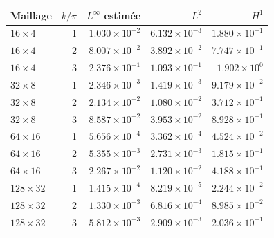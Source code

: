 \begin{tabular}{lrrrr}
\toprule
Maillage & \(k/\pi\) & \(L^\infty\) estimée & \(L^2\) & \(H^1\) \\
\midrule
\(16\times4\) & 1 & \(1.030\times10^{-2}\) & \(6.132\times10^{-3}\) & \(1.880\times10^{-1}\) \\
\(16\times4\) & 2 & \(8.007\times10^{-2}\) & \(3.892\times10^{-2}\) & \(7.747\times10^{-1}\) \\
\(16\times4\) & 3 & \(2.376\times10^{-1}\) & \(1.093\times10^{-1}\) & \(1.902\times10^{0}\) \\
\(32\times8\) & 1 & \(2.346\times10^{-3}\) & \(1.419\times10^{-3}\) & \(9.179\times10^{-2}\) \\
\(32\times8\) & 2 & \(2.134\times10^{-2}\) & \(1.080\times10^{-2}\) & \(3.712\times10^{-1}\) \\
\(32\times8\) & 3 & \(8.587\times10^{-2}\) & \(3.953\times10^{-2}\) & \(8.928\times10^{-1}\) \\
\(64\times16\) & 1 & \(5.656\times10^{-4}\) & \(3.362\times10^{-4}\) & \(4.524\times10^{-2}\) \\
\(64\times16\) & 2 & \(5.355\times10^{-3}\) & \(2.731\times10^{-3}\) & \(1.815\times10^{-1}\) \\
\(64\times16\) & 3 & \(2.267\times10^{-2}\) & \(1.120\times10^{-2}\) & \(4.188\times10^{-1}\) \\
\(128\times32\) & 1 & \(1.415\times10^{-4}\) & \(8.219\times10^{-5}\) & \(2.244\times10^{-2}\) \\
\(128\times32\) & 2 & \(1.330\times10^{-3}\) & \(6.816\times10^{-4}\) & \(8.985\times10^{-2}\) \\
\(128\times32\) & 3 & \(5.812\times10^{-3}\) & \(2.909\times10^{-3}\) & \(2.036\times10^{-1}\) \\
\bottomrule
\end{tabular}
